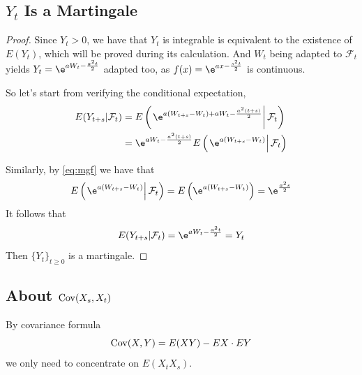     \subsection{$Y_t$ Is a Martingale}
    \begin{proof}
        Since $Y_t>0$, we have that $Y_t$ is integrable is equivalent
        to the existence of $E(Y_t)$, which will be proved during
        its calculation. And $W_t$ being adapted to $\mathcal F_t$ yields
        $Y_t=\e^{aW_t-\frac{a^2t}{2}}$ adapted too,
        as $f(x)=\e^{ax-\frac{s^2t}{2}}$ is continuous.

        So let's start from verifying the conditional expectation,
        \[\begin{aligned}
            E(Y_{t+s}|\mathcal F_t)
            &=E\left(\left.\e^{a(W_{t+s}-W_t)+aW_t-\frac{a^2(t+s)}{2}}\right|\mathcal F_t\right)\\
            &=\e^{aW_t-\frac{a^2(t+s)}{2}}E\left(\left.\e^{a(W_{t+s}-W_t)}\right|\mathcal F_t\right)
        \end{aligned}\]

        Similarly, by \cref{eq:mgf} we have that
        \[E\left(\left.\e^{a(W_{t+s}-W_t)}\right|\mathcal F_t\right)
        =E\left(\e^{a(W_{t+s}-W_t)}\right)
        =\e^{\frac{a^2s}{2}}\]
        It follows that
        \[E(Y_{t+s}|\mathcal F_t)=\e^{aW_t-\frac{a^2t}{2}}=Y_t\]
        Then $\{Y_t\}_{t\geq 0}$ is a martingale.
    \end{proof}

    \subsection{About $\mathrm{Cov}(X_s,X_t)$}
    By covariance formula
    \[\mathrm{Cov}(X,Y)=E(XY)-EX\cdot EY\]
    we only need to concentrate on $E(X_tX_s)$.

